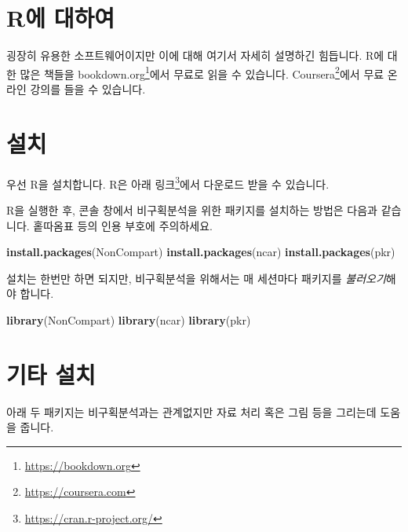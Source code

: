 \documentclass[
  12pt,
]{krantz}
\newenvironment{Shaded}{\begin{snugshade}}{\end{snugshade}}
\newcommand{\KeywordTok}[1]{\textcolor[rgb]{0.13,0.29,0.53}{\textbf{#1}}}
\newcommand{\NormalTok}[1]{#1}
\newcommand{\StringTok}[1]{\textcolor[rgb]{0.31,0.60,0.02}{#1}}
\begin{document}
\hypertarget{basic}{%
\section{R에 대하여}\label{basic}}

굉장히 유용한 소프트웨어이지만 이에 대해 여기서 자세히 설명하긴 힘듭니다.
R에 대한 많은 책들을 bookdown.org\footnote{\url{https://bookdown.org}}에서 무료로 읽을 수 있습니다.
Coursera\footnote{\url{https://coursera.com}}에서 무료 온라인 강의를 들을 수 있습니다.

\hypertarget{install}{%
\section{설치}\label{install}}

우선 R을 설치합니다.
R은 아래 링크\footnote{\url{https://cran.r-project.org/}}에서 다운로드 받을 수 있습니다.

R을 실행한 후, 콘솔 창에서 비구획분석을 위한 패키지를 설치하는 방법은 다음과 같습니다.
홑따옴표 등의 인용 부호에 주의하세요.

\begin{Shaded}
\begin{Highlighting}[]
\KeywordTok{install.packages}\NormalTok{(}\StringTok{\textquotesingle{}NonCompart\textquotesingle{}}\NormalTok{)}
\KeywordTok{install.packages}\NormalTok{(}\StringTok{\textquotesingle{}ncar\textquotesingle{}}\NormalTok{)}
\KeywordTok{install.packages}\NormalTok{(}\StringTok{\textquotesingle{}pkr\textquotesingle{}}\NormalTok{)}
\end{Highlighting}
\end{Shaded}

설치는 한번만 하면 되지만, 비구획분석을 위해서는 매 세션마다 패키지를 \emph{불러오기}해야 합니다.

\begin{Shaded}
\begin{Highlighting}[]
\KeywordTok{library}\NormalTok{(NonCompart)}
\KeywordTok{library}\NormalTok{(ncar)}
\KeywordTok{library}\NormalTok{(pkr)}
\end{Highlighting}
\end{Shaded}

\hypertarget{otherinstall}{%
\section{기타 설치}\label{otherinstall}}

아래 두 패키지는 비구획분석과는 관계없지만 자료 처리 혹은 그림 등을 그리는데 도움을 줍니다.
\end{document}
